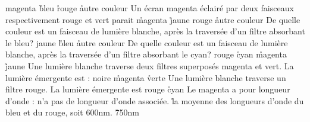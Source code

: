 \rv
magenta
\r
bleu
\r
rouge
\r
autre couleur
\q
Un écran magenta éclairé par deux faisceaux respectivement rouge et vert parait
\r
magenta
\r
jaune
\rv
rouge
\r
autre couleur
\q
De quelle couleur est un faisceau de lumière blanche, après la traversée d'un filtre absorbant le bleu?
\rv
jaune
\r
bleu
\r
autre couleur
\q
De quelle couleur est un faisceau de lumière blanche, après la traversée d'un filtre absorbant le cyan?
\rv
rouge
\r
cyan
\r
magenta
\r
jaune
\q
Une lumière blanche traverse deux filtres superposés magenta et vert. La lumière émergente est :
\rv
noire
\r
magenta
\r
verte
\q
Une lumière blanche traverse un filtre rouge. La lumière émergente est 
\rv
rouge
\r
cyan
\q
Le magenta a pour longueur d'onde :
\rv
n'a pas de longueur d'onde associée.
\r
la moyenne des longueurs d'onde du bleu et du rouge, soit 600nm.
\r
750nm





